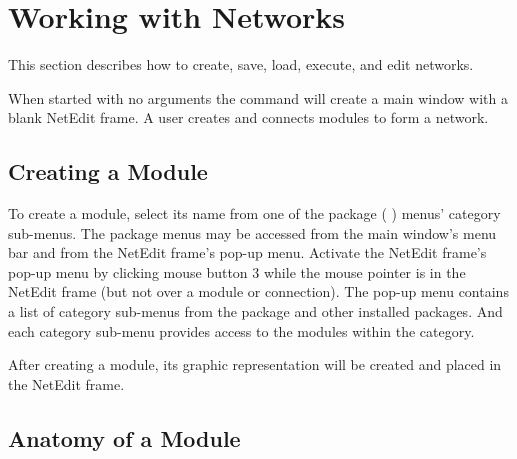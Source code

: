 %
%
%
%
%

%

\section{Working with Networks}
\label{sec:workwithnets}

This section describes how to create, save, load, execute, and edit
networks.

When started with no arguments the  command will create a
main window with a blank NetEdit frame.  A user creates and
connects modules to form a network.


\subsection{Creating a Module}
\label{sec:creatingmodules}

To create a module, select its name from one of the package (\eg{} \sr)
menus' category sub-menus.  The package menus may be accessed from the
main window's menu bar and from the NetEdit frame's pop-up menu. 
Activate the NetEdit frame's pop-up menu by clicking mouse button
3 while the mouse pointer is in the NetEdit frame (but not over a
module or connection).  The pop-up menu contains a list of category
sub-menus from the \sr{} package and other installed packages.  And
each category sub-menu provides access to the modules within the
category.

After creating a module, its graphic representation will be created and
placed in the NetEdit frame.

\subsection{Anatomy of a Module}
\label{sec:modanatomy}

